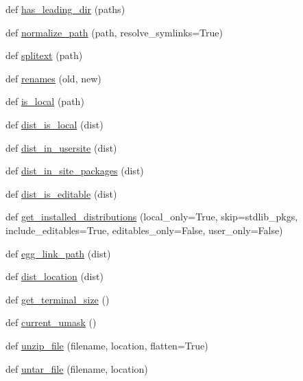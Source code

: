 \begin{DoxyCompactItemize}
\item 
def \hyperlink{namespacepip_1_1utils_a7d54e83fa5ef04195ba6b6857a509843}{has\+\_\+leading\+\_\+dir} (paths)
\item 
def \hyperlink{namespacepip_1_1utils_af323d1b60753dd3167f8282c2b85a251}{normalize\+\_\+path} (path, resolve\+\_\+symlinks=True)
\item 
def \hyperlink{namespacepip_1_1utils_ad917756b1f0c6f2befbc8ac48d28ac10}{splitext} (path)
\item 
def \hyperlink{namespacepip_1_1utils_a4bf83ce3cebda670755566883f68e02b}{renames} (old, new)
\item 
def \hyperlink{namespacepip_1_1utils_ad21ea3b5107add164a16ee06ea1a5235}{is\+\_\+local} (path)
\item 
def \hyperlink{namespacepip_1_1utils_a351b073e578787c7fbb84c776478d256}{dist\+\_\+is\+\_\+local} (dist)
\item 
def \hyperlink{namespacepip_1_1utils_a97c22bdc73a3099c925fe895cdb65b95}{dist\+\_\+in\+\_\+usersite} (dist)
\item 
def \hyperlink{namespacepip_1_1utils_a911356b6335aff55445ce7d6a2bbb86b}{dist\+\_\+in\+\_\+site\+\_\+packages} (dist)
\item 
def \hyperlink{namespacepip_1_1utils_ac0730c2dab662a0c11a4600cc6a240c3}{dist\+\_\+is\+\_\+editable} (dist)
\item 
def \hyperlink{namespacepip_1_1utils_a971c6731f6875ba85bc5a593e28736d2}{get\+\_\+installed\+\_\+distributions} (local\+\_\+only=True, skip=stdlib\+\_\+pkgs, include\+\_\+editables=True, editables\+\_\+only=False, user\+\_\+only=False)
\item 
def \hyperlink{namespacepip_1_1utils_a8024e48cf0ad54a8b596d7ce9c650406}{egg\+\_\+link\+\_\+path} (dist)
\item 
def \hyperlink{namespacepip_1_1utils_aec8195a6a4a7b4bdbe335de31a28b39c}{dist\+\_\+location} (dist)
\item 
def \hyperlink{namespacepip_1_1utils_a8de6d6632766e3b204fa25bc86eb4762}{get\+\_\+terminal\+\_\+size} ()
\item 
def \hyperlink{namespacepip_1_1utils_a931b19a4aa22cb6859279b00ade41735}{current\+\_\+umask} ()
\item 
def \hyperlink{namespacepip_1_1utils_a347d0ea57e212bff4fc9e79bdca31a7b}{unzip\+\_\+file} (filename, location, flatten=True)
\item 
def \hyperlink{namespacepip_1_1utils_acec3a95969ac24c6df26c7842dfd8644}{untar\+\_\+file} (filename, location)
\item 

\end{DoxyCompactItemize}
